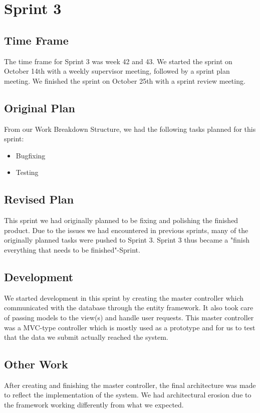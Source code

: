 \chapter{Sprint 3}

\section{Time Frame}
The time frame for Sprint 3 was week 42 and 43. We started the sprint on October 14th with a weekly supervisor meeting, followed by a sprint plan meeting. We finished the sprint on October 25th with a sprint review meeting.

\section{Original Plan}
From our Work Breakdown Structure, we had the following tasks planned for this sprint:
\begin{itemize}
	\item Bugfixing
	\item Testing
\end{itemize}

\section{Revised Plan}
This sprint we had originally planned to be fixing and polishing the finished product. Due to the issues we had encountered in previous sprints, many of the originally planned tasks were pushed to Sprint 3. Sprint 3 thus became a "finish everything that needs to be finished"-Sprint.

\section{Development}
We started development in this sprint by creating the master controller which communicated with the database through the entity framework. It also took care of passing models to the view(s) and handle user requests. This master controller was a MVC-type controller which is mostly used as a prototype and for us to test that the data we submit actually reached the system.

\section{Other Work}
After creating and finishing the master controller, the final architecture was made to reflect the implementation of the system. We had architectural erosion due to the framework working differently from what we expected.

